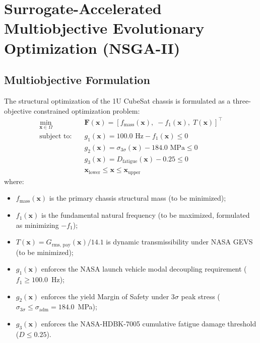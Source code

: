 \documentclass[preprint,12pt,3p]{elsarticle}
\newcommand{\Grmspay}{G_{\text{rms, pay}}}
\begin{document}
\section{Surrogate-Accelerated Multiobjective Evolutionary Optimization (NSGA-II)}
\label{sec:optimization}

\subsection{Multiobjective Formulation}
The structural optimization of the 1U CubeSat chassis is formulated as a three-objective constrained optimization problem:
\begin{equation}
  \begin{aligned}
    \min_{\mathbf{x} \in \Omega} \quad & \mathbf{F}(\mathbf{x}) = \left[ f_{\text{mass}}(\mathbf{x}), \; -f_1(\mathbf{x}), \; T(\mathbf{x}) \right]^\top \\
    \text{subject to:} \quad 
    & g_1(\mathbf{x}) = 100.0\text{ Hz} - f_1(\mathbf{x}) \le 0 \\
    & g_2(\mathbf{x}) = \sigma_{3\sigma}(\mathbf{x}) - 184.0\text{ MPa} \le 0 \\
    & g_3(\mathbf{x}) = D_{\text{fatigue}}(\mathbf{x}) - 0.25 \le 0 \\
    & \mathbf{x}_{\text{lower}} \le \mathbf{x} \le \mathbf{x}_{\text{upper}}
  \end{aligned}
  \label{eq:moo_problem}
\end{equation}
where:
\begin{itemize}
  \item $f_{\text{mass}}(\mathbf{x})$ is the primary chassis structural mass (to be minimized);
  \item $f_1(\mathbf{x})$ is the fundamental natural frequency (to be maximized, formulated as minimizing $-f_1$);
  \item $T(\mathbf{x}) = \Grmspay(\mathbf{x}) / 14.1$ is dynamic transmissibility under NASA GEVS (to be minimized);
  \item $g_1(\mathbf{x})$ enforces the NASA launch vehicle modal decoupling requirement ($f_1 \ge 100.0$~Hz);
  \item $g_2(\mathbf{x})$ enforces the yield Margin of Safety under $3\sigma$ peak stress ($\sigma_{3\sigma} \le \sigma_{\text{adm}} = 184.0$~MPa);
  \item $g_3(\mathbf{x})$ enforces the NASA-HDBK-7005 cumulative fatigue damage threshold ($D \le 0.25$).
\end{itemize}
\end{document}
